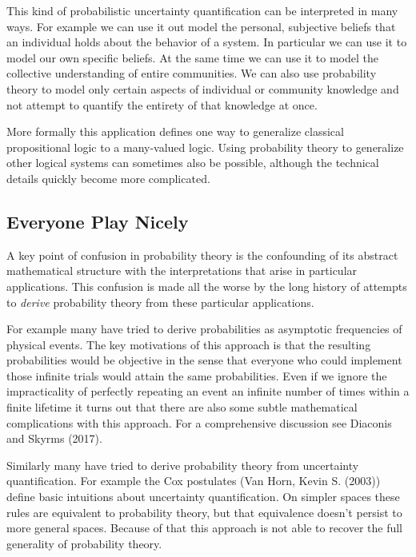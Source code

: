 \documentclass[
  letterpaper,
  DIV=11,
  numbers=noendperiod]{scrartcl}
\begin{document}
This kind of probabilistic uncertainty quantification can be interpreted
in many ways. For example we can use it out model the personal,
subjective beliefs that an individual holds about the behavior of a
system. In particular we can use it to model our own specific beliefs.
At the same time we can use it to model the collective understanding of
entire communities. We can also use probability theory to model only
certain aspects of individual or community knowledge and not attempt to
quantify the entirety of that knowledge at once.

More formally this application defines one way to generalize classical
propositional logic to a many-valued logic. Using probability theory to
generalize other logical systems can sometimes also be possible,
although the technical details quickly become more complicated.

\hypertarget{everyone-play-nicely}{%
\subsection{Everyone Play Nicely}\label{everyone-play-nicely}}

A key point of confusion in probability theory is the confounding of its
abstract mathematical structure with the interpretations that arise in
particular applications. This confusion is made all the worse by the
long history of attempts to \emph{derive} probability theory from these
particular applications.

For example many have tried to derive probabilities as asymptotic
frequencies of physical events. The key motivations of this approach is
that the resulting probabilities would be objective in the sense that
everyone who could implement those infinite trials would attain the same
probabilities. Even if we ignore the impracticality of perfectly
repeating an event an infinite number of times within a finite lifetime
it turns out that there are also some subtle mathematical complications
with this approach. For a comprehensive discussion see Diaconis and
Skyrms (2017).

Similarly many have tried to derive probability theory from uncertainty
quantification. For example the Cox postulates (Van Horn, Kevin S.
(2003)) define basic intuitions about uncertainty quantification. On
simpler spaces these rules are equivalent to probability theory, but
that equivalence doesn't persist to more general spaces. Because of that
this approach is not able to recover the full generality of probability
theory.
\end{document}
